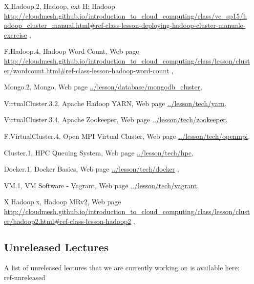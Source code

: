 X.Hadoop.2, Hadoop, ext H: Hadoop \url{http://cloudmesh.github.io/introduction_to_cloud_computing/class/vc_sp15/hadoop_cluster_manual.html#ref-class-lesson-deploying-hadoop-cluster-manuale-exercise}  , 


F.Hadoop.4, Hadoop Word Count, Web page \url{http://cloudmesh.github.io/introduction_to_cloud_computing/class/lesson/cluster/wordcount.html#ref-class-lesson-hadoop-word-count}  , 


Mongo.2, Mongo, Web page \url{../lesson/database/mongodb_cluster}, 




VirtualCluster.3.2, Apache Hadoop YARN, Web page \url{../lesson/tech/yarn},   


VirtualCluster.3.4, Apache Zookeeper, Web page \url{../lesson/tech/zookeeper}, 

F.VirtualCluster.4, Open MPI Virtual Cluster,  Web page \url{../lesson/tech/openmpi},

Cluster.1, HPC Queuing System, Web page \url{../lesson/tech/hpc},

Docker.1, Docker Basics, Web page \url{../lesson/tech/docker} ,

VM.1, VM Software - Vagrant, Web page \url{../lesson/tech/vagrant}, 

X.Hadoop.x, Hadoop MRv2, Web page \url{http://cloudmesh.github.io/introduction_to_cloud_computing/class/lesson/cluster/hadoop2.html#ref-class-lesson-hadoop2} ,



\subsection{Unreleased Lectures}\label{unreleased-lectures}

A list of unreleased lectures that we are currently working on is
available here: ref-unreleased


